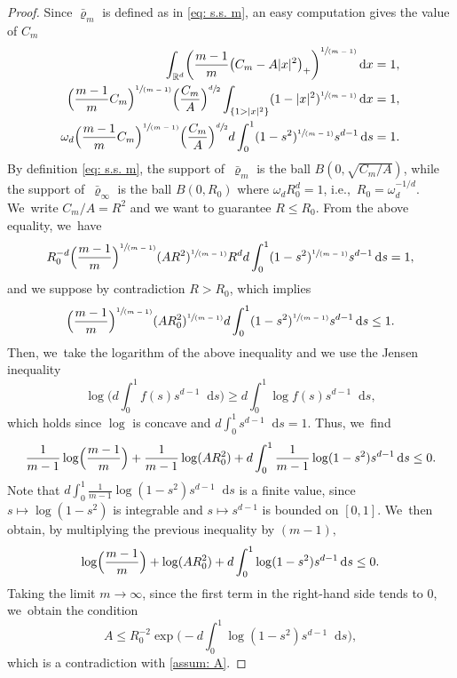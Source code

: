 \documentclass[11pt]{article}
\newcommand{\ie}{i.e.,\xspace}
\numberwithin{equation}{section}
\newcommand{\spfrac}[2]{\sfrac{#1}{(#2)}}
\newcommand{\prt}[1]{(#1)}
\newcommand{\bprt}[1]{\bigl(#1\bigr)}
\newcommand{\Bprt}[1]{\Bigl(#1\Bigr)}
\newcommand{\bbprt}[1]{\biggl(#1\biggr)}
\newcommand{\dx}[1]{\mathop{}\!\mathrm{d} #1}
\newcommand{\R}{\mathbb{R}}
\theoremstyle{plain}
\theoremstyle{remark}
\begin{document}
\begin{proof}
Since $\bar\varrho_m$ is defined as in \eqref{eq: s.s. m}, an easy computation gives the value of $C_m$
\begin{equation*}
\begin{aligned}
\int_{\R^d}\bbprt{{\frac{m-1}{m}}\bprt{C_m - A |x|^2}_+}^{\spfrac{1}{m-1}} \dx x&= 1,\\
\Bprt{\frac{m-1}{m} C_m}^{\spfrac{1}{m-1}} \Bprt{\frac{C_m}{A}}^{\sfrac d 2}\int_{\{1>|x|^2\}}\prt{1- |x|^2}^{\spfrac{1}{m-1}} \dx x&= 1,\\
\omega_d\Bprt{\frac{m-1}{m} C_m}^{\spfrac{1}{m-1}} \Bprt{\frac{C_m}{A}}^{\sfrac d 2}{ d}\int_0^1\prt{1- s^2}^{\spfrac{1}{m-1}} s^{d-1}\dx s&= 1.
\end{aligned}
\end{equation*}
By definition \eqref{eq: s.s. m}, the support of~$\bar \varrho_m$ is the ball $B(0,\sqrt{C_m/A})$, while the support of~$\bar \varrho_\infty$ is the ball $B(0,R_0)$ where $\omega_dR_0^d=1$, \ie \ $R_0=\omega_d^{-1/d}$. We~write $C_m/A=R^2$ and we want to guarantee $R\leq R_0$.
From the above equality, we~have
\[
R_0^{-d} \Bprt{\frac{m-1}{m}}^{\spfrac{1}{m-1}} (AR^2)^{\spfrac{1}{m-1}}R^d{ d}\int_0^1\prt{1- s^2}^{\spfrac{1}{m-1}} s^{d-1}\dx s= 1,
\]
and we suppose by contradiction $R>R_0$, which implies
\[
\Bprt{\frac{m-1}{m}}^{\spfrac{1}{m-1}} (AR_0^2)^{\spfrac{1}{m-1}}{ d}\int_0^1\prt{1- s^2}^{\spfrac{1}{m-1}} s^{d-1}\dx s\leq 1.
\]
Then, we~take the logarithm of the above inequality and we use the Jensen inequality
\[
\log \biggl({ d}\int_0^1 f(s)s^{d-1}\dx s\biggr)\geq{ d}\int_0^1\log f(s) s^{d-1}\dx s,
\]
which holds since $\log$ is concave and ${ d}\int_0^1 s^{d-1}\dx s=1$. Thus, we~find
\[
\frac{1}{m-1}\log\Bigl(\frac{m-1}{m}\Bigr)+ \frac{1}{m-1}\log (AR_0^2)+{ d}\int_0^1 \frac{1}{m-1}\log\prt{1- s^2} s^{d-1}\dx s\leq 0.
\]
Note that ${ d}\int_0^1 \frac{1}{m-1}\log\prt{1- s^2} s^{d-1}\dx s$ is a finite value, since $s\mapsto\log(1-s^{2})$ is integrable and $s\mapsto s^{d-1}$ is bounded on $[0,1]$. We~then obtain, by multiplying the previous inequality by $(m-1),$
\[
\log\Bprt{\frac{m-1}{m}}+ \log (AR_0^2)+{ d}\int_0^1 \log\prt{1- s^2} s^{d-1}\dx s\leq 0.
\]
Taking the limit $m\to\infty$, since the first term in the right-hand side tends to $0$, we~obtain the condition
\[
A\leq R_0^{-2}\exp\biggl(-{ d}\int_0^1 \log\prt{1- s^2} s^{d-1}\dx s\biggr),
\]
which is a contradiction with \eqref{assum: A}.
\end{proof}

\end{document}
